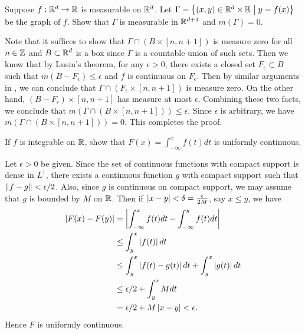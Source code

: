 \begin{exercise}
    Suppose $f:\mathbb{R}^d\to\mathbb{R}$ is measurable on $\mathbb{R}^d$. Let $\Gamma = \left\{ (x,y)\in\mathbb{R}^d\times\mathbb{R} \;\middle\vert\; y=f(x) \right\}$ be the graph of $f$. Show that $\Gamma$ is measurable in $\mathbb{R}^{d+1}$ and $m(\Gamma)=0$. 
\end{exercise}
\begin{pf}
    Note that it suffices to show that $\Gamma\cap (B\times [n,n+1])$ is measure zero for all 
    $n\in\mathbb{Z}$ and $B\subset\mathbb{R}^d$ is a box since $\Gamma$ is a countable union of such sets. 
    Then we know that by Lusin's theorem, for any $\epsilon>0$, there exists a closed 
    set $F_\epsilon\subset B$ such that $m(B-F_\epsilon)\leq\epsilon$ and $f$ is continuous 
    on $F_\epsilon$. Then by similar arguments in , we can conclude that 
    $\Gamma\cap (F_\epsilon\times[n,n+1])$ is measure zero. On the other hand, 
    $(B-F_\epsilon)\times[n,n+1]$ has measure at most $\epsilon$. Combining these two facts, 
    we conclude that $m(\Gamma\cap (B\times [n,n+1]))\leq\epsilon$. Since $\epsilon$ 
    is arbitrary, we have $m(\Gamma\cap (B\times [n,n+1]))=0$. This completes the 
    proof.
\end{pf}

\begin{exercise}
    If $f$ is integrable on $\mathbb{R}$, show that $F(x) = \int_{-\infty}^{x} f(t)dt$ is uniformly 
    continuous. 
\end{exercise}
\begin{pf}
    Let $\epsilon>0$ be given. Since the set of continuous functions with compact support 
    is dense in $L^1$, there exists a continuous function $g$ with compact support such that 
    $\left\lVert {f-g} \right\rVert<\epsilon/2$. Also, since $g$ is continuous on compact support, we may assume 
    that $g$ is bounded by $M$ on $\mathbb{R}$. Then if $\left\lvert {x-y} \right\rvert<\delta = \frac{\epsilon}{2M}$, say 
    $x\leq y$, we have
    \begin{equation*}
        \begin{split}
            \left\lvert {F(x)-F(y)} \right\rvert 
            &= \left\lvert {\int_{-\infty}^{x} f(t)dt - \int_{-\infty}^{y} f(t)dt} \right\rvert \\
            &\leq \int_{y}^{x} \left\lvert {f(t)} \right\rvert dt \\
            &\leq \int_{y}^{x} \left\lvert {f(t)-g(t)} \right\rvert dt + \int_{y}^{x} \left\lvert {g(t)} \right\rvert dt \\
            &\leq \epsilon/2 + \int_{y}^{x} Mdt \\ 
            &= \epsilon/2 + M\left\lvert {x-y} \right\rvert < \epsilon.
        \end{split}
    \end{equation*}
    Hence $F$ is uniformly continuous.
\end{pf}


